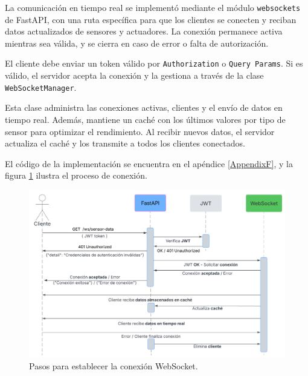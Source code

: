 

La comunicación en tiempo real se implementó mediante el módulo
\texttt{websockets} de FastAPI, con una ruta específica para que los clientes
se conecten y reciban datos actualizados de sensores y actuadores. La conexión
permanece activa mientras sea válida, y se cierra en caso de error o falta de
autorización.

El cliente debe enviar un token válido por \texttt{Authorization} o
\texttt{Query Params}. Si es válido, el servidor acepta la conexión y la
gestiona a través de la clase \texttt{WebSocketManager}.

Esta clase administra las conexiones activas, clientes y el envío de datos en
tiempo real. Además, mantiene un caché con los últimos valores por tipo de
sensor para optimizar el rendimiento. Al recibir nuevos datos, el servidor
actualiza el caché y los transmite a todos los clientes conectados.

El código de la implementación se encuentra en el apéndice \ref{AppendixF}, y
la figura \ref{fig:websocket} ilustra el proceso de conexión.

\begin{figure}[H]
    \centering
    \includegraphics[width=.90\textwidth]{./Images/23.png}
    \caption{Pasos para establecer la conexión WebSocket.}
    \label{fig:websocket}
\end{figure}

